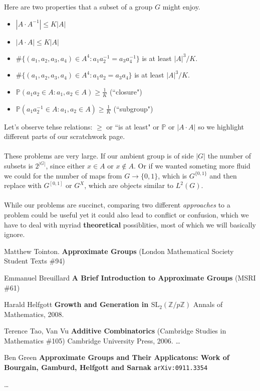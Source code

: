 \documentclass[12pt]{article}
\begin{document}
{\noindent Here are two properties that a subset of a group $G$ might enjoy.  
\begin{itemize}
\item $|A \cdot A^{-1}| \leq K |A|$
\item $|A \cdot A | \leq K |A|$
\item $\#\{ (a_1, a_2, a_3, a_4) \in A^4 : a_1 a_2^{-1} = a_3 a_4^{-1} \} $ is at least $|A|^3/K $.
\item $\#\{ (a_1, a_2, a_3, a_4) \in A^4 : a_1 a_2 = a_3 a_4 \} $ is at least $|A|^3/K $.
\item $\mathbb{P}(a_1 a_2 \in A : a_1, a_2 \in A) \geq \frac{1}{K} $ (``closure")
\item $\mathbb{P}(a_1 a_2^{-1} \in A : a_1, a_2 \in A) \geq \frac{1}{K} $ (``subgroup")
\end{itemize}
Let's observe tehse relations:  $\geq$ or ``is at least" or $\mathbb{P}$ or $|A \cdot A|$ so we highlight different parts of our scratchwork page. \\ \\
These problems are very large.  If our ambient group is of side $|G|$ the number of subsets is $2^{|G|}$, since either $x \in A$ or $x \notin A$.  Or if we wanted someting more fluid we could for the number of maps from $G \to \{ 0,1\}$, which is $G^{\{ 0,1 \}}$ and then replace with $G^{[0,1]}$ or $G^X$, which are objects similar to $L^2(G)$. \\ \\
While our problems are succinct, comparing two different \textit{approaches} to a problem could be useful yet it could also lead to conflict or confusion, which we have to deal with myriad \textbf{theoretical} possiblities, most of which we will basically ignore.

\vfill

\begin{thebibliography}{}

\item Matthew Tointon.  \textbf{Approximate Groups} (London Mathematical Society Student Texts \#94)

\item Emmanuel Breuillard \textbf{A Brief Introduction to Approximate Groups} (MSRI \#61)

\item Harald Helfgott \textbf{Growth and Generation in $\text{SL}_2 (\mathbb{Z}/p\mathbb{Z})$} Annals of Mathematics, 2008.

\item Terence Tao, Van Vu \textbf{Additive Combinatorics}  (Cambridge Studies in Mathematics \#105) Cambridge University Press, 2006. \dots

\item Ben Green \textbf{Approximate Groups and Their Applicatons: Work of Bourgain, Gamburd, Helfgott and Sarnak} \texttt{arXiv:0911.3354}

\item \dots 

\end{thebibliography}
}
\end{document}
